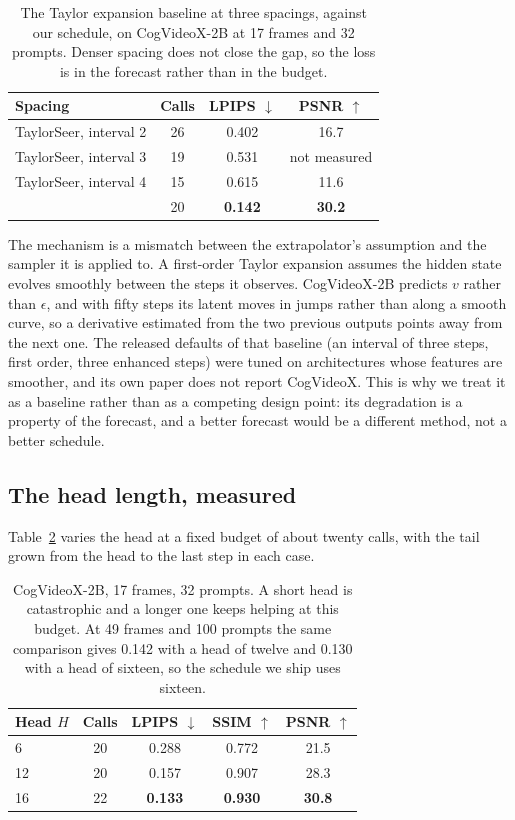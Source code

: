 \begin{table}[h]
\centering\footnotesize\setlength{\tabcolsep}{5pt}
\begin{tabular}{lccc}
\toprule
Spacing & Calls & LPIPS $\downarrow$ & PSNR $\uparrow$ \\
\midrule
TaylorSeer, interval 2 & 26 & 0.402 & 16.7 \\
TaylorSeer, interval 3 & 19 & 0.531 & not measured \\
TaylorSeer, interval 4 & 15 & 0.615 & 11.6 \\
\midrule
\method{} & 20 & \textbf{0.142} & \textbf{30.2} \\
\bottomrule
\end{tabular}
\caption{The Taylor expansion baseline at three spacings, against our schedule, on CogVideoX-2B at 17 frames and 32 prompts. Denser spacing does not close the gap, so the loss is in the forecast rather than in the budget.}
\label{tab:taylor}
\end{table}

The mechanism is a mismatch between the extrapolator's assumption and the sampler it is applied to. A first-order Taylor expansion assumes the hidden state evolves smoothly between the steps it observes. CogVideoX-2B predicts $v$ rather than $\epsilon$, and with fifty steps its latent moves in jumps rather than along a smooth curve, so a derivative estimated from the two previous outputs points away from the next one. The released defaults of that baseline (an interval of three steps, first order, three enhanced steps) were tuned on architectures whose features are smoother, and its own paper does not report CogVideoX. This is why we treat it as a baseline rather than as a competing design point: its degradation is a property of the forecast, and a better forecast would be a different method, not a better schedule.

\subsection{The head length, measured}
\label{app:head}

Table~\ref{tab:head} varies the head at a fixed budget of about twenty calls, with the tail grown from the head to the last step in each case.

\begin{table}[h]
\centering\footnotesize\setlength{\tabcolsep}{5pt}
\begin{tabular}{lcccc}
\toprule
Head $H$ & Calls & LPIPS $\downarrow$ & SSIM $\uparrow$ & PSNR $\uparrow$ \\
\midrule
6  & 20 & 0.288 & 0.772 & 21.5 \\
12 & 20 & 0.157 & 0.907 & 28.3 \\
16 & 22 & \textbf{0.133} & \textbf{0.930} & \textbf{30.8} \\
\bottomrule
\end{tabular}
\caption{CogVideoX-2B, 17 frames, 32 prompts. A short head is catastrophic and a longer one keeps helping at this budget. At 49 frames and 100 prompts the same comparison gives 0.142 with a head of twelve and 0.130 with a head of sixteen, so the schedule we ship uses sixteen.}
\label{tab:head}
\end{table}


